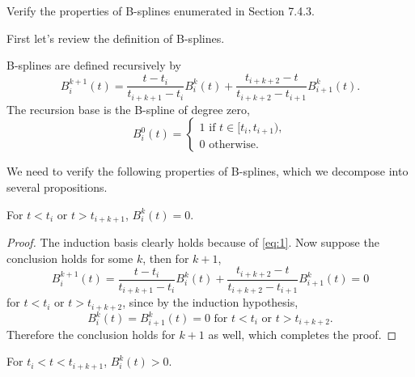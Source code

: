 \begin{pro}
  Verify the properties of B-splines enumerated in Section 7.4.3.
\end{pro}
\begin{sol}
  First let's review the definition of B-splines.
  \begin{defn}
    B-splines are defined recursively by
    \begin{equation}
      \label{eq:Bsplines}
      B_i^{k+1}(t) = \frac{t-t_i}{t_{i+k+1}-t_{i}}B_i^k(t) +
      \frac{t_{i+k+2}-t}{t_{i+k+2}-t_{i+1}}B_{i+1}^{k}(t).
    \end{equation}
    The recursion base is the B-spline of degree zero,
    \begin{equation}
      \label{eq:1}
      B_i^0(t) =
      \begin{cases}
        1 \text{ if } t\in [t_i, t_{i+1}), \\
        0 \text{ otherwise.}
      \end{cases}
    \end{equation}
  \end{defn}
  We need to verify the following properties of B-splines,
  which we decompose into several propositions.

  \begin{prop}
    \label{prop:1}
    For $t<t_i$ or $t>t_{i+k+1}$,
    $B_i^k(t)=0$.
  \end{prop}
  \begin{proof}
    The induction basis clearly holds because of \eqref{eq:1}.
    Now suppose the conclusion holds for some $k$,
    then for $k+1$,
    \begin{displaymath}
            B_i^{k+1}(t) = \frac{t-t_i}{t_{i+k+1}-t_{i}}B_i^k(t) +
      \frac{t_{i+k+2}-t}{t_{i+k+2}-t_{i+1}}B_{i+1}^{k}(t) = 0
    \end{displaymath}
    for $t<t_i$ or $t>t_{i+k+2}$, since by the induction hypothesis,
    \begin{displaymath}
      B_i^k(t) = B_{i+1}^k(t) = 0 \text{ for } t<t_i \text{ or } t>t_{i+k+2}.
    \end{displaymath}
    Therefore the conclusion holds for $k+1$ as well,
    which completes the proof.
  \end{proof}

  \begin{prop}
    For $t_i<t<t_{i+k+1}$, $B_i^k(t)>0$.
  \end{prop}


\end{sol}
